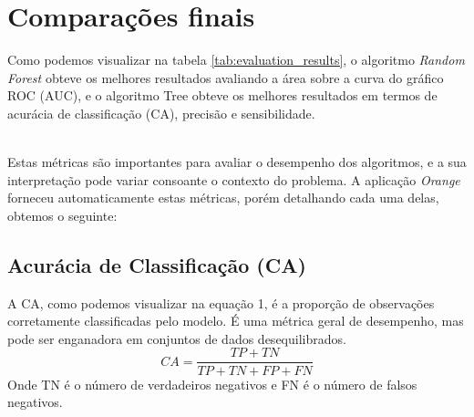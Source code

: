 \documentclass[conference]{IEEEtran}
\begin{document}
\section{Comparações finais}
Como podemos visualizar na tabela \ref{tab:evaluation_results}, o algoritmo \textit{Random Forest} obteve os melhores resultados avaliando a área sobre
a curva do gráfico ROC (AUC), e o algoritmo Tree obteve os melhores resultados em termos de acurácia de classificação (CA), precisão e sensibilidade.
\begin{table}[!ht]
	\centering
	\caption{Comparação de Resultados dos Algoritmos}
	\label{tab:evaluation_results}

\end{table}
\\

Estas métricas são importantes para avaliar o desempenho dos algoritmos, e a sua interpretação pode variar consoante o contexto do problema.
A aplicação \textit{Orange} forneceu automaticamente estas métricas, porém detalhando cada uma delas, obtemos o seguinte:
\subsection{Acurácia de Classificação (CA)}
A CA, como podemos visualizar na equação 1, é a proporção de observações corretamente classificadas pelo modelo. É uma métrica geral de desempenho, mas pode ser enganadora em conjuntos de dados
desequilibrados.
\begin{equation}
	CA = \frac{TP + TN}{TP + TN + FP + FN}
\end{equation}
Onde TN é o número de verdadeiros negativos e FN é o número de falsos negativos.
\end{document}
